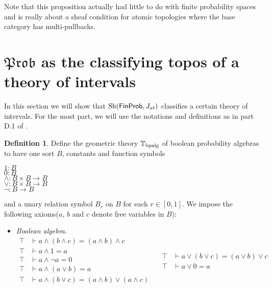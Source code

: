 \documentclass[a4paper]{amsproc}
\theoremstyle{plain}
\theoremstyle{definition}
\newtheorem{definition}[theorem]{Definition}
\theoremstyle{remark}
\numberwithin{equation}{section}
\DeclareMathOperator{\Sh}{Sh}
\newcommand{\FinProb}{\textup{\textsf{FinProb}}}
\newcommand{\Prob}{\mathfrak{Prob}}
\begin{document}
Note that this proposition actually had little to do with finite probability spaces and is really about a sheaf condition for atomic topologies where the base category has multi-pullbacks.


\section{$\Prob$ as the classifying topos of a theory of intervals}\label{section_classifying}

In this section we will show that $\Sh(\FinProb, J_{at})$ classifies a certain theory of intervals. For the most part, we will use the notations and definitions as in part D.1 of \cite{johnstone2002sketches2}.

\begin{definition}
    Define the geometric theory $\mathbb{T}_{\textup{bpalg}}$ of boolean probability algebras to have one sort $B$, constants and function symbols
    \begin{center}
        $1: B$ \\
        $0: B$ \\
        $\wedge: B \times B \to B$ \\
        $\vee: B \times B \to B$ \\
        $\neg: B \to B$
    \end{center}
    and a unary relation symbol $B_r$ on $B$ for each $r \in [0,1]$. We impose the following axioms($a$, $b$ and $c$ denote free variables in $B$):
    \begin{itemize}
        \item \textit{Boolean algebra}.
        \begin{equation*}
            \begin{split}
                \top &\vdash a \wedge (b \wedge c) = (a \wedge b) \wedge c \\
                \top &\vdash a \wedge 1 = a \\
                \top &\vdash a \wedge \neg{a} = 0 \\
                \top &\vdash a \wedge (a \vee b) = a \\
                \top &\vdash a \wedge (b \vee c) = (a \wedge b) \vee (a \wedge c) \\
            \end{split}
            \quad
            \begin{split}
                \top &\vdash a \vee (b \vee c) = (a \vee b) \vee c \\
                \top &\vdash a \vee 0 = a \\

\end{split}
\end{equation*}
\end{itemize}
\end{definition}
\end{document}

